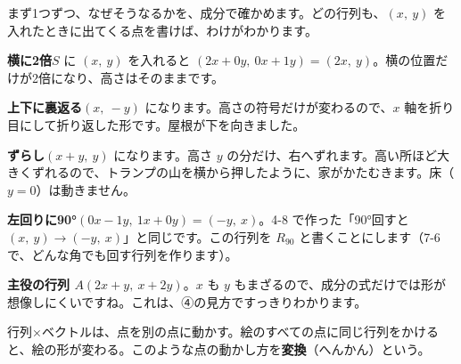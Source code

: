 まず1つずつ、なぜそうなるかを、成分で確かめます。どの行列も、$(x,\ y)$ を入れたときに出てくる点を書けば、わけがわかります。
\begin{enumerate}[label={\bkcircled[\bkTT]{\arabic*}}, leftmargin=2.4\zw, itemsep=3pt, topsep=3pt]
\item \textbf{横に2倍}\quad $S$ に $(x,\ y)$ を入れると $(2x+0y,\ 0x+1y)=(2x,\ y)$。横の位置だけが2倍になり、高さはそのままです。
\item \textbf{上下に裏返る}\quad $(x,\ -y)$ になります。高さの符号だけが変わるので、$x$ 軸を折り目にして折り返した形です。屋根が下を向きました。
\item \textbf{ずらし}\quad $(x+y,\ y)$ になります。高さ $y$ の分だけ、右へずれます。高い所ほど大きくずれるので、トランプの山を横から押したように、家がかたむきます。床（$y=0$）は動きません。
\item \textbf{左回りに90°}\quad $(0x-1y,\ 1x+0y)=(-y,\ x)$。4-8 で作った「90°回すと $(x,\ y)\to(-y,\ x)$」と同じです。この行列を $R_{90}$ と書くことにします（7-6 で、どんな角でも回す行列を作ります）。
\item \textbf{主役の行列 $A$}\quad $(2x+y,\ x+2y)$。$x$ も $y$ もまざるので、成分の式だけでは形が想像しにくいですね。これは、④の見方ですっきりわかります。
\end{enumerate}


\begin{taisetsu}
行列×ベクトルは、点を別の点に動かす。絵のすべての点に同じ行列をかけると、絵の形が変わる。このような点の動かし方を\textbf{変換}（へんかん）という。
\end{taisetsu}

\label{bk:7-2:retsu}

